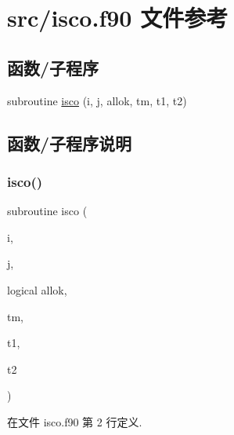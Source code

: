 \hypertarget{isco_8f90}{}\section{src/isco.f90 文件参考}
\label{isco_8f90}
\subsection*{函数/子程序}
\begin{DoxyCompactItemize}
\item 
subroutine \mbox{\hyperlink{isco_8f90_a3b77823a20219107cd4dbe957d70fd6c}{isco}} (i, j, allok, tm, t1, t2)
\end{DoxyCompactItemize}


\subsection{函数/子程序说明}
\mbox{\label{isco_8f90_a3b77823a20219107cd4dbe957d70fd6c}} 
\subsubsection{\texorpdfstring{isco()}{isco()}}
{\footnotesize\ttfamily subroutine isco (\begin{DoxyParamCaption}\item[{}]{i,  }\item[{}]{j,  }\item[{logical}]{allok,  }\item[{}]{tm,  }\item[{}]{t1,  }\item[{}]{t2 }\end{DoxyParamCaption})}



在文件 isco.\+f90 第 2 行定义.

